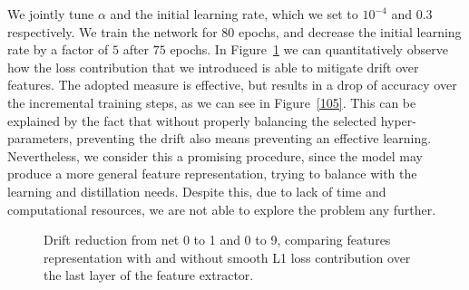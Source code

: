 \documentclass[10pt,twocolumn,letterpaper]{article}
\begin{document}
We jointly tune $\alpha$ and the initial learning rate, which we set to $10^{-4}$ and $0.3$ respectively. We train the network for $80$ epochs, and decrease the initial learning rate by a factor of $5$ after $75$ epochs. In Figure~\ref{5:histogram2} we can quantitatively observe how the loss contribution that we introduced is able to mitigate drift over features. The adopted measure is effective, but results in a drop of accuracy over the incremental training steps, as we can see in Figure~\ref{105}. This can be explained by the fact that without properly balancing the selected hyper-parameters, preventing the drift also means preventing an effective learning. Nevertheless, we consider this a promising procedure, since the model may produce a more general feature representation, trying to balance with the learning and distillation needs. Despite this, due to lack of time and computational resources, we are not able to explore the problem any further.

\begin{figure}
\begin{center}
\end{center}
\caption{Drift reduction from net 0 to 1 and 0 to 9, comparing features representation with and without smooth L1 loss contribution over the last layer of the feature extractor.}
\label{5:histogram2}
\end{figure}
\end{document}
